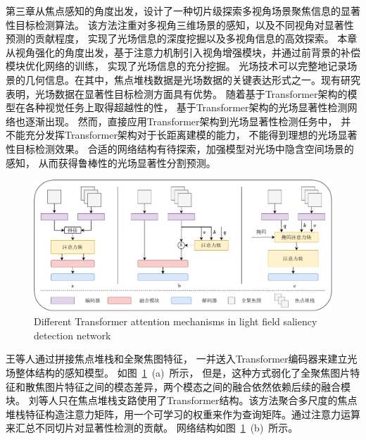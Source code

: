 \label{chap:part4}
%
%
%
%
第三章从焦点感知的角度出发，设计了一种切片级探索多视角场景聚焦信息的显著性目标检测算法。
该方法注重对多视角三维场景的感知，以及不同视角对显著性预测的贡献程度，
实现了光场信息的深度挖掘以及多视角信息的高效探索。
%
%
本章从视角强化的角度出发，基于注意力机制引入视角增强模块，并通过前背景的补偿模块优化网络的训练，
实现了光场信息的充分挖掘。
%
%
%
%
%
%
%
%
光场技术可以完整地记录场景的几何信息。在其中，焦点堆栈数据是光场数据的关键表达形式之一。现有研究表明，光场数据在显著性目标检测方面具有优势。
随着基于Transformer架构的模型在各种视觉任务上取得超越性的性，
基于Transformer架构的光场显著性检测网络也逐渐出现。
然而，直接应用Transformer架构到光场显著性检测任务中，
并不能充分发挥Transformer架构对于长距离建模的能力，
不能得到理想的光场显著性目标检测效果。
合适的网络结构有待探索，加强模型对光场中隐含空间场景的感知，
从而获得鲁棒性的光场显著性分割预测。
%
%
%
%
%
%
%
\par
%
%
\begin{figure}[!ht]
	\centering
	\includegraphics[width=0.95\linewidth]{figures/chapter4/task2_ins.drawio}
	{Different Transformer attention mechanisms in light field saliency detection network}  
	\label{cpt4_fig1:task2_ins}
\end{figure}
%
%
%
%
王等人通过拼接焦点堆栈和全聚焦图特征，
一并送入Transformer编码器来建立光场整体结构的感知模型。
如图~\ref{cpt4_fig1:task2_ins}~(a)~所示，
但是，这种方式弱化了全聚焦图片特征和散焦图片特征之间的模态差异，两个模态之间的融合依然依赖后续的融合模块。
刘等人只在焦点堆栈支路使用了Transformer结构。该方法聚合多尺度的焦点堆栈特征构造注意力矩阵，用一个可学习的权重来作为查询矩阵。通过注意力运算来汇总不同切片对显著性检测的贡献。
网络结构如图~\ref{cpt4_fig1:task2_ins}~(b)~所示。
